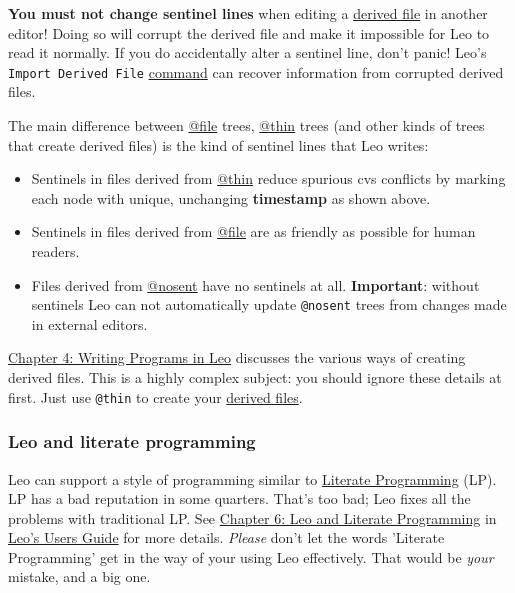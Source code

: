 \documentclass[10pt,a4paper,english]{article}
\begin{document}
\textbf{You must not change sentinel lines} when editing a \href{\#derived-files}{derived file} in another
editor! Doing so will corrupt the derived file and make it impossible for Leo to
read it normally. If you do accidentally alter a sentinel line, don't panic!
Leo's \texttt{Import Derived File} \href{commands.html}{command} can recover information from corrupted
derived files.

The main difference between \href{glossary.html\#file}{@file} trees, \href{glossary.html\#thin}{@thin} trees (and other kinds of trees that create derived files)
is the kind of sentinel lines that Leo writes:
\begin{itemize}
\item {} 
Sentinels in files derived from \href{glossary.html\#thin}{@thin} reduce spurious cvs conflicts by
marking each node with unique, unchanging \textbf{timestamp} as shown above.

\item {} 
Sentinels in files derived from \href{glossary.html\#file}{@file} are as friendly as possible for human readers.

\item {} 
Files derived from \href{glossary.html\#nosent}{@nosent} have no sentinels at all.
\textbf{Important}: without sentinels Leo can not automatically update
\texttt{@nosent} trees from changes made in external editors.

\end{itemize}

\href{directives.html}{Chapter 4: Writing Programs in Leo} discusses the various ways of creating derived files.
This is a highly complex subject: you should ignore these details at first.
Just use \texttt{@thin} to create your \href{\#derived-files}{derived files}.



\hypertarget{leo-and-literate-programming}{}
\subsubsection*{Leo and literate programming}

Leo can support a style of programming similar to \href{http://www.literateprogramming.com/}{Literate Programming} (LP).
LP has a bad reputation in some quarters. That's too bad; Leo fixes all the
problems with traditional LP. See \href{design.html}{Chapter 6: Leo and Literate Programming} in
\href{leo_TOC.html}{Leo's Users Guide} for more details. \emph{Please} don't let the words 'Literate
Programming' get in the way of your using Leo effectively. That would be \emph{your}
mistake, and a big one.
\end{document}
